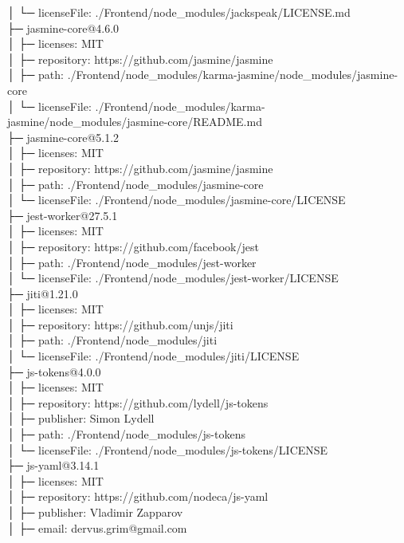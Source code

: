 │  └─ licenseFile: ./Frontend/node\_modules/jackspeak/LICENSE.md\\
├─ jasmine-core@4.6.0\\
│  ├─ licenses: MIT\\
│  ├─ repository: https://github.com/jasmine/jasmine\\
│  ├─ path: ./Frontend/node\_modules/karma-jasmine/node\_modules/jasmine-core\\
│  └─ licenseFile: ./Frontend/node\_modules/karma-jasmine/node\_modules/jasmine-core/README.md\\
├─ jasmine-core@5.1.2\\
│  ├─ licenses: MIT\\
│  ├─ repository: https://github.com/jasmine/jasmine\\
│  ├─ path: ./Frontend/node\_modules/jasmine-core\\
│  └─ licenseFile: ./Frontend/node\_modules/jasmine-core/LICENSE\\
├─ jest-worker@27.5.1\\
│  ├─ licenses: MIT\\
│  ├─ repository: https://github.com/facebook/jest\\
│  ├─ path: ./Frontend/node\_modules/jest-worker\\
│  └─ licenseFile: ./Frontend/node\_modules/jest-worker/LICENSE\\
├─ jiti@1.21.0\\
│  ├─ licenses: MIT\\
│  ├─ repository: https://github.com/unjs/jiti\\
│  ├─ path: ./Frontend/node\_modules/jiti\\
│  └─ licenseFile: ./Frontend/node\_modules/jiti/LICENSE\\
├─ js-tokens@4.0.0\\
│  ├─ licenses: MIT\\
│  ├─ repository: https://github.com/lydell/js-tokens\\
│  ├─ publisher: Simon Lydell\\
│  ├─ path: ./Frontend/node\_modules/js-tokens\\
│  └─ licenseFile: ./Frontend/node\_modules/js-tokens/LICENSE\\
├─ js-yaml@3.14.1\\
│  ├─ licenses: MIT\\
│  ├─ repository: https://github.com/nodeca/js-yaml\\
│  ├─ publisher: Vladimir Zapparov\\
│  ├─ email: dervus.grim@gmail.com\\
